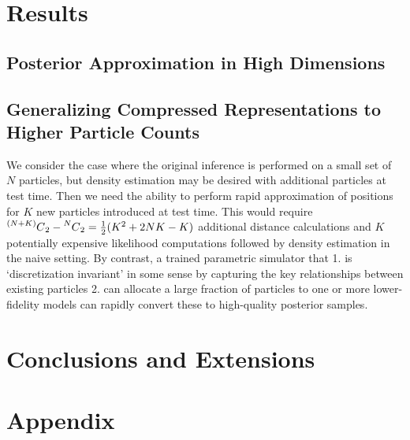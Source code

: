 \documentclass[12pt]{article}
\newcommand\Mycomb[2][^n]{\prescript{#1\mkern-0.5mu}{}C_{#2}}
\renewcommand{\[}{\left[}
\renewcommand{\]}{\right]}
\renewcommand{\(}{\left(}
\renewcommand{\)}{\right)}
\begin{document}
\section{Results}

\subsection{Posterior Approximation in High Dimensions}


\subsection{Generalizing Compressed Representations to Higher Particle Counts}
We consider the case where the original inference is performed on a small set of $N$ particles, but density estimation may be desired with additional particles at test time. 
Then we need the ability to perform rapid approximation of positions for $K$ new particles introduced at test time. 
This would require $\Mycomb[(N+K)]{2} - \Mycomb[N]{2} = \frac{1}{2}(K^2 + 2NK - K)$ additional distance calculations and $K$ potentially expensive likelihood computations followed by density estimation in the naive setting. 
By contrast, a trained parametric simulator that 1. is `discretization invariant' in some sense by capturing the key relationships between existing particles 2. can allocate a large fraction of particles to one or more lower-fidelity models can rapidly convert these to high-quality posterior samples.

\subsection{}

\section{Conclusions and Extensions}






\section*{Appendix}
\end{document}
